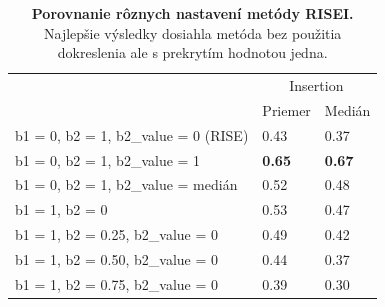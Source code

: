 \begin{table}[]
    \centering
    \begin{tabular}{l|l|l|}
        \cline{2-3}
                                                                    & \multicolumn{2}{c|}{Insertion} \\ \cline{2-3} 
                                                                    & Priemer        & Medián        \\ \hline
        \multicolumn{1}{|l|}{b1 =  0, b2 = 1, b2\_value = 0 (RISE)} & 0.43           & 0.37          \\ \hline
        \multicolumn{1}{|l|}{b1 =  0, b2 = 1, b2\_value = 1}        & \textbf{0.65}  & \textbf{0.67} \\ \hline
        \multicolumn{1}{|l|}{b1 =  0, b2 = 1, b2\_value = medián}     & 0.52           & 0.48          \\ \hline
        \multicolumn{1}{|l|}{b1 =  1, b2 = 0}                        & 0.53           & 0.47          \\ \hline
        \multicolumn{1}{|l|}{b1 =  1, b2 = 0.25, b2\_value = 0}     & 0.49           & 0.42          \\ \hline
        \multicolumn{1}{|l|}{b1 =  1, b2 = 0.50, b2\_value = 0}      & 0.44           & 0.37          \\ \hline
        \multicolumn{1}{|l|}{b1 =  1, b2 = 0.75, b2\_value = 0}     & 0.39           & 0.30          \\ \hline
    \end{tabular}
    \caption{\textbf{Porovnanie rôznych nastavení metódy RISEI.} Najlepšie výsledky dosiahla metóda bez použitia dokreslenia ale s prekrytím hodnotou jedna.}
    \label{tab:experiment_risei_various_configuration}
\end{table}

